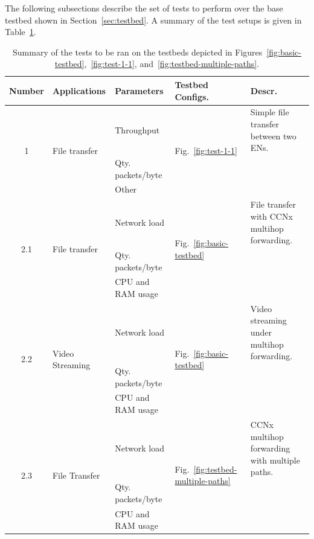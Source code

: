 The following subsections describe the set of tests to perform over the 
base testbed shown in Section~\ref{sec:testbed}. A summary of the test setups 
is given in Table~\ref{tab:tests}.

\begin{table}[H]
    \centering
    \begin{threeparttable}
    \footnotesize
        \begin{tabularx}{1.00\textwidth}{ c l l X l }
            \toprule
            \textbf{Number} & \textbf{Applications} & \textbf{Parameters} & \textbf{Testbed Configs.} & \textbf{Descr.}\\ [0.5ex]
            \midrule
            \multirow{3}{*}{1} & \multirow{3}{*}{File transfer} & Throughput & \multirow{3}{*}{Fig.~\ref{fig:test-1-1}} & Simple file transfer between two ENs.\\ [0.5ex]
                & & Qty. packets\slash byte & \\ [0.5ex]
                & & Other                   & \\ [0.5ex]
            \midrule
            \multirow{3}{*}{2.1} & \multirow{3}{*}{File transfer} & Network load & \multirow{3}{*}{Fig.~\ref{fig:basic-testbed}} & File transfer with CCNx multihop forwarding.\\ [0.5ex]
                & & Qty. packets\slash byte & & \\ [0.5ex]
                & & CPU and RAM usage       & & \\ [0.5ex]
            \midrule
            \multirow{3}{*}{2.2} & \multirow{3}{*}{Video Streaming} & Network load & \multirow{3}{*}{Fig.~\ref{fig:basic-testbed}} & Video streaming under multihop forwarding.\\ [0.5ex]
                & & Qty. packets\slash byte & & \\ [0.5ex]
                & & CPU and RAM usage       & & \\ [0.5ex]
            \midrule
            \multirow{3}{*}{2.3} & \multirow{3}{*}{File Transfer} & Network load & \multirow{3}{*}{Fig.~\ref{fig:testbed-multiple-paths}} & CCNx multihop forwarding with multiple paths.\\ [0.5ex]
                & & Qty. packets\slash byte & & \\ [0.5ex]
                & & CPU and RAM usage       & & \\ [0.5ex]
            \bottomrule
        \end{tabularx}
    \caption{Summary of the tests to be ran on the testbeds depicted 
        in Figures~\ref{fig:basic-testbed},~\ref{fig:test-1-1}, and~\ref{fig:testbed-multiple-paths}.}
    \label{tab:tests}
    \end{threeparttable}
\end{table}

